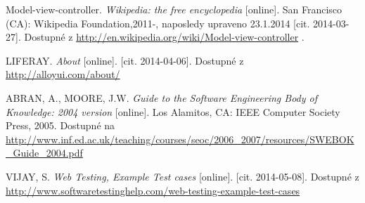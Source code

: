 \documentclass{fithesis}
\begin{document}
\begin{thebibliography}{0}
Model-view-controller. \textit{Wikipedia: the free encyclopedia} [online]. San Francisco (CA): Wikipedia Foundation,2011-, naposledy upraveno 23.1.2014 [cit. 2014-03-27]. Dostupné z \url{http://en.wikipedia.org/wiki/Model-view-controller} .

LIFERAY. \textit{About} [online]. [cit. 2014-04-06]. Dostupné z \url{http://alloyui.com/about/}

ABRAN, A., MOORE, J.W. \textit{Guide to the Software Engineering Body of Knowledge: 2004 version} [online]. Los Alamitos, CA: IEEE Computer Society Press, 2005. Dostupné na \url{http://www.inf.ed.ac.uk/teaching/courses/seoc/2006_2007/resources/SWEBOK_Guide_2004.pdf} 

VIJAY, S. \textit{Web Testing, Example Test cases} [online]. [cit. 2014-05-08]. Dostupné z \url{http://www.softwaretestinghelp.com/web-testing-example-test-cases} 

\end{thebibliography}
\end{document}
